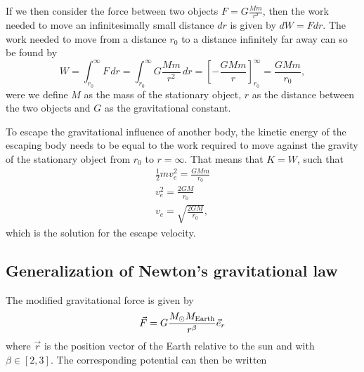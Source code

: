 \documentclass[../main.tex]{subfiles}
\begin{document}
If we then consider the force between two objects $F = G \frac{Mm}{r^2}$, then the work needed to move an infinitesimally small distance $dr$ is given by $dW = Fdr$. The work needed to move from a distance $r_0$ to a distance infinitely far away can so be found by 
\begin{equation}
W = \int_{r_0}^{\infty} F\, dr = \int_{r_0}^{\infty} G \frac{Mm}{r^2}\, dr = \left[ -\frac{GMm}{r}  \right]_{r_0}^{\infty} = \frac{GMm}{r_0},
\end{equation} were we define $M$ as the mass of the stationary object, $r$ as the distance between the two objects and $G$ as the gravitational constant.

To escape the gravitational influence of another body, the kinetic energy of the escaping body needs to be equal to the work required to move against the gravity of the stationary object from $r_0$ to $r = \infty$. That means that $K = W$, such that 
\begin{align}
    \frac{1}{2} m v_{e}^{2} = \frac{GMm}{r_0} \\
    v_{e}^{2} = \frac{2GM}{r_0} \\
    v_{e} = \sqrt{\frac{2GM}{r_0}},
\end{align}
which is the solution for the escape velocity. 

\subsection{Generalization of Newton's gravitational law}
The modified gravitational force is given by 
\begin{align}
    \vec{F}=G\frac{M_{\odot} M_{\textnormal{\text{Earth}}}}{r^{\beta}}\vec{e}_r
\end{align} where \ensuremath{\vec{r}} is the position vector of the Earth relative to the sun and with \ensuremath{\beta \in [2,3]}. The corresponding potential can then be written
\end{document}
